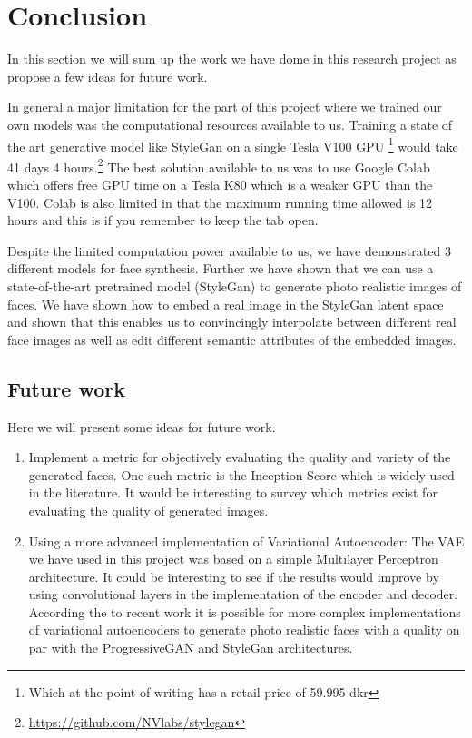 
\section{Conclusion}


In this section we will sum up the work we have dome in this research project as propose a few ideas for future work.

In general a major limitation for the part of this project where we trained our own models was the computational resources available to us.
Training a state of the art generative model like StyleGan on a single Tesla V100 GPU \footnote{Which at the point of writing has a retail price of 59.995 dkr} would take 41 days 4 hours.\footnote{\url{https://github.com/NVlabs/stylegan}}
The best solution available to us was to use Google Colab which offers free GPU time on a Tesla K80 which is a weaker GPU than the V100. Colab is also limited in that the maximum running time allowed is 12 hours and this is if you remember to keep the tab open.

Despite the limited computation power available to us, we have demonstrated 3 different models for face synthesis.
Further we have shown that we can use a state-of-the-art pretrained model (StyleGan) to generate photo realistic images of faces. We have shown how to embed a real image in the StyleGan latent space and shown that this enables us to convincingly interpolate between different real face images as well as edit different semantic attributes of the embedded images.



\subsection{Future work}

Here we will present some ideas for future work.
\begin{enumerate}
    \item Implement a metric for objectively evaluating the quality and variety of the generated faces. One such metric is the Inception Score which is widely used in the literature. It would be interesting to survey which metrics exist for evaluating the quality of generated images.

    \item Using a more advanced implementation of Variational Autoencoder: The VAE we have used in this project was based on a simple Multilayer Perceptron architecture. It could be interesting to see if the results would improve by using convolutional layers in the implementation of the encoder and decoder.  According the to recent work \cite{vqvae2} it is possible for more complex implementations of variational autoencoders to generate photo realistic faces with a quality on par with the ProgressiveGAN and StyleGan architectures.
\end{enumerate}
